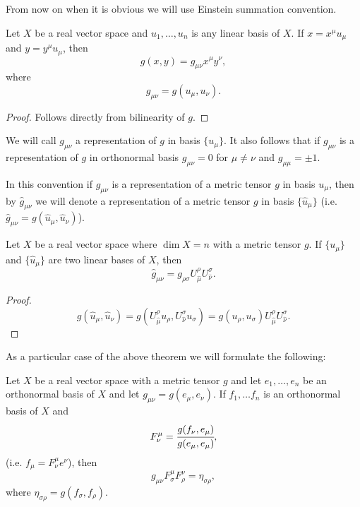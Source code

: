 \documentclass[main.tex]{subfiles}
\begin{document}
From now on when it is obvious we will use Einstein summation convention.

\begin{theorem}
Let $X$ be a real vector space and $u_1, \dots, u_n$
is any linear basis of $X$. If $x = x^\mu u_\mu$ and $y = y^\mu u_\mu$, then
\begin{equation}
g(x, y) = g_{\mu\nu} x^\mu y^\nu,
\end{equation}
where 
\begin{equation}
g_{\mu \nu} = g(u_\mu, u_\nu).
\end{equation}
\end{theorem}
\begin{proof}
Follows directly from bilinearity of $g$. 
\end{proof}

We will call $g_{\mu\nu}$ a representation of $g$ in basis $\{u_\mu\}$. It also follows that if $g_{\mu\nu}$ is a representation of $g$ in orthonormal basis 
$g_{\mu\nu} = 0$ 
for $\mu\not=\nu$ 
and $g_{\mu\mu} = \pm 1$.

In this convention if $g_{\mu\nu}$ is a representation of a metric tensor $g$ in basis $u_\mu$, then by $\hat{g}_{\mu\nu}$ we will denote a representation of a metric tensor $g$ in basis $\{\hat{u}_\mu\}$ (i.e. $\hat{g}_{\mu\nu} = g(\hat{u}_\mu, \hat{u}_\nu)$).

\begin{theorem}
\label{metric-transformation}
Let $X$ be a real vector space where $\dim X = n$ with a metric tensor $g$. If $\{u_\mu\}$ and $\{\hat{u}_\mu\}$ are two linear bases of $X$, then
\begin{equation}
\hat{g}_{\mu\nu} = g_{\rho\sigma} U^{\rho}_{\hat{\mu}} U^{\sigma}_{\hat{\nu}}.
\end{equation}
\end{theorem}
\begin{proof}
\begin{equation}
g(\hat{u}_\mu, \hat{u}_\nu) = g(U^{\rho}_{\hat{\mu}} u_\rho, U^{\sigma}_{\hat{\nu}} u_\sigma) = 
g(u_\rho, u_\sigma)  U^{\rho}_{\hat{\mu}} U^{\sigma}_{\hat{\nu}}.
\end{equation}
\end{proof}

As a particular case of the above theorem we will formulate the following: 

\begin{theorem}
Let $X$ be a real vector space with a metric tensor $g$ and let $e_1, \dots, e_n$ be an orthonormal basis of $X$ and let $g_{\mu\nu} = g(e_\mu, e_\nu)$. If $f_1, \dots f_n$ is an orthonormal basis of $X$ and
\begin{equation}
F^\mu_\nu = \cfrac{g(f_\nu, e_\mu)}{g(e_\mu, e_\mu)}, 
\end{equation} 
(i.e. $f_\mu = F^\mu_\nu e^\nu$), then
\begin{equation}
g_{\mu\nu} F^\mu_\sigma F^\nu_\rho = \eta_{\sigma\rho},
\end{equation}
where $\eta_{\sigma\rho} = g(f_\sigma, f_\rho)$. 
\end{theorem}
\end{document}
